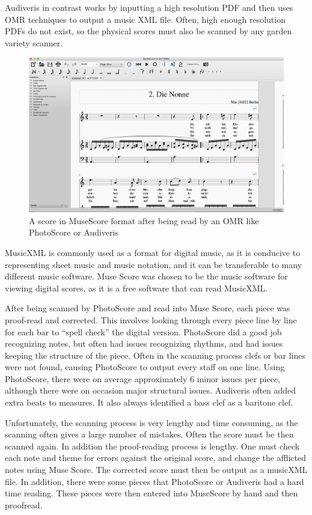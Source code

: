 \documentclass[12pt,twoside]{reedthesis}
\theoremstyle{definition}
\theoremstyle{definition}
\theoremstyle{definition}
\theoremstyle{remark}
\begin{document}
Audiveris in contrast works by inputting a high resolution PDF and then
uses OMR techniques to output a music XML file. Often, high enough
resolution PDFs do not exist, so the physical scores must also be
scanned by any garden variety scanner.
\begin{figure}[h]
\centering
\includegraphics[scale=.30]{images/museScore.png}
\caption{A score in MuseScore format after being read by an OMR like PhotoScore or Audiveris}
\label{subd}
\end{figure}
MusicXML is commonly used as a format for digital music, as it is
conducive to representing sheet music and music notation, and it can be
transferable to many different music software. Muse Score was chosen to
be the music software for viewing digital scores, as it is a free
software that can read MusicXML.

After being scanned by PhotoScore and read into Muse Score, each piece
was proof-read and corrected. This involves looking through every piece
line by line for each bar to ``spell check'' the digital version.
PhotoScore did a good job recognizing notes, but often had issues
recognizing rhythms, and had issues keeping the structure of the piece.
Often in the scanning process clefs or bar lines were not found, causing
PhotoScore to output every staff on one line. Using PhotoScore, there
were on average approximately 6 minor issues per piece, although there
were on occasion major structural issues. Audiveris often added extra
beats to measures. It also always identified a bass clef as a baritone
clef.

Unfortunately, the scanning process is very lengthy and time consuming,
as the scanning often gives a large number of mistakes. Often the score
must be then scanned again. In addition the proof-reading process is
lengthy. One must check each note and theme for errors against the
original score, and change the afflicted notes using Muse Score. The
corrected score must then be output as a musicXML file. In addition,
there were some pieces that PhotoScore or Audiveris had a hard time
reading. These pieces were then entered into MuseScore by hand and then
proofread.
\end{document}
